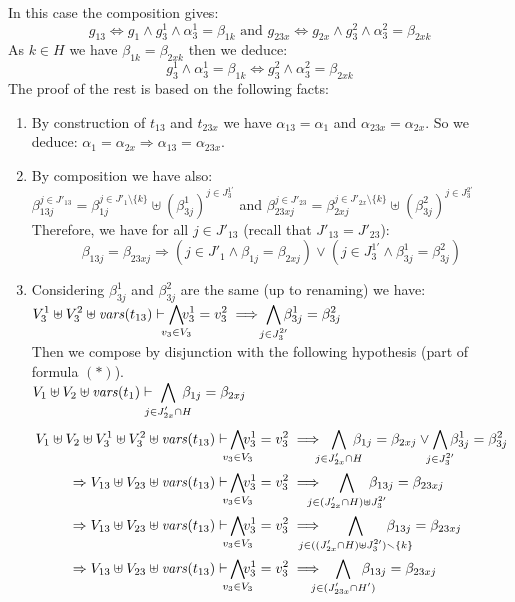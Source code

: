 \documentclass[runningheads]{llncs}
\begin{document}
\begin{enumerate}
In this case the composition gives: \[g_{13} \Leftrightarrow g_1 \wedge g^1_3 \wedge \alpha^1_3=\beta_{1k} \text{ and }
g_{23x}  \Leftrightarrow g_{2x} \wedge g^2_3 \wedge \alpha^2_3=\beta_{2xk}\]
As $k \in H$ we have   
$\beta_{1k} = \beta_{2xk}$ then we  deduce:
\[g^1_3 \wedge \alpha^1_3=\beta_{1k}  \Leftrightarrow g^2_3 \wedge \alpha^2_3= \beta_{2xk}\]
The proof of the rest  is based on the following facts: 
\begin{enumerate}
\item  By construction of  $t_{13}$ and $t_{23x}$ we have $\alpha_{13}=
\alpha_{1}$ and $\alpha_{23x}=\alpha_{2x}$. So we deduce: 
$\alpha_{1} = \alpha_{2x} \Rightarrow \alpha_{13} = \alpha_{23x}$.
\item By composition we have also: \\ $\beta_{13j}^{j\in J'_{13}}= \beta_{1j}^{j \in J'_{1}  \setminus \{k\}} \uplus   {(\beta^1_{3j})^{j \in J^{1 \prime}_3} }$
and $\beta_{23xj}^{j\in J'_{23}}= \beta_{2xj}^{j \in J'_{2x}  \setminus \{k\}} \uplus   {(\beta^2_{3j})^{j \in J^{2 \prime}_3} }$\\
Therefore, we have for all $j\in J'_{13}$ (recall that $J'_{13}=J'_{23}$):  \[\beta_{13j} = \beta_{23xj} \Rightarrow (j\in J'_1 \land \beta_{1j} = \beta_{2xj}) \vee (j\in J_3^{1\prime} \land \beta^1_{3j}= \beta^2_{3j})\]
\item 
Considering $\beta^1_{3j}$ and  $\beta^2_{3j}$  are the same (up to renaming)  we have: \\
${\displaystyle V^1_{3} \uplus V^2_{3} \uplus \fvars{t_{13}} \vdash \bigwedge_\subbox{v_3\in V_3}\!\! v^1_3=v^2_3\implies \bigwedge_\subbox{j \in J^{2 \prime}_3} \beta^1_{3j}= \beta^2_{3j}}$\\
Then we compose by  disjunction with the following hypothesis (part of formula $(*)$).\\ $V_{1} \uplus V_{2} \uplus \fvars{t_1}  \vdash {\displaystyle \bigwedge_\subbox{j \in J'_{2x} \cap H} \beta_{1j} = \beta_{2xj}}$ 
\begin{align*}
 V_{1} \uplus V_{2}  \uplus V^1_{3} \uplus V^2_{3} \uplus \fvars{t_{13}}\vdash &    \bigwedge_\subbox{v_3\in V_3}\!\! v^1_3=v^2_3 \implies {\displaystyle \bigwedge_\subbox{j \in J'_{2x} \cap H} \beta_{1j} = \beta_{2xj}} \vee {\displaystyle \bigwedge_\subbox{j \in J^{2 \prime}_3} \beta^1_{3j}= \beta^2_{3j}}\\
\Rightarrow  V_{13} \uplus V_{23}  \uplus \fvars{t_{13}}\vdash & \bigwedge_\subbox{v_3\in V_3}\!\! v^1_3=v^2_3\implies {\displaystyle \bigwedge_\subbox{j \in (J'_{2x}   \cap H)\uplus J^{2 \prime}_3 } \beta_{13j} = \beta_{23xj}} \\  
\Rightarrow  V_{13} \uplus V_{23}  \uplus \fvars{t_{13}}\vdash & \bigwedge_\subbox{v_3\in V_3}\!\! v^1_3=v^2_3\implies {\displaystyle \bigwedge_\subbox{j \in    ((J'_{2x}   \cap H)\uplus J^{2 \prime}_3)\setminus \{k\} } \beta_{13j} = \beta_{23xj}} \\
\Rightarrow    V_{13} \uplus V_{23}  \uplus \fvars{t_{13}}\vdash & \bigwedge_\subbox{v_3\in V_3}\!\! v^1_3=v^2_3\implies {\displaystyle \bigwedge_\subbox{j \in (J'_{23x}   \cap H') } \beta_{13j} = \beta_{23xj}}
\end{align*}
\end{enumerate}


\end{enumerate}
\end{document}
